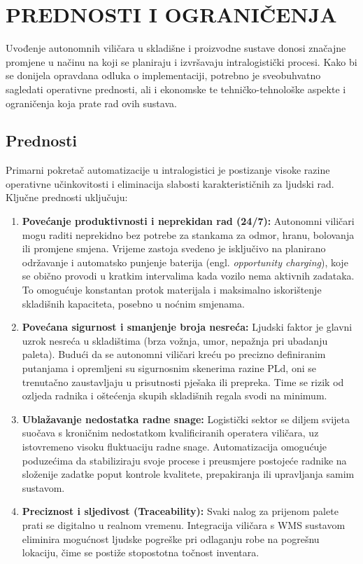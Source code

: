 \documentclass[12pt,a4paper]{article}
\begin{document}
\section{PREDNOSTI I OGRANIČENJA}
Uvođenje autonomnih viličara u skladišne i proizvodne sustave donosi značajne promjene u načinu na koji se planiraju i izvršavaju intralogistički procesi. Kako bi se donijela opravdana odluka o implementaciji, potrebno je sveobuhvatno sagledati operativne prednosti, ali i ekonomske te tehničko-tehnološke aspekte i ograničenja koja prate rad ovih sustava.

\subsection{Prednosti}
Primarni pokretač automatizacije u intralogistici je postizanje visoke razine operativne učinkovitosti i eliminacija slabosti karakterističnih za ljudski rad. Ključne prednosti uključuju:
\begin{enumerate}
    \item \textbf{Povećanje produktivnosti i neprekidan rad (24/7):} Autonomni viličari mogu raditi neprekidno bez potrebe za stankama za odmor, hranu, bolovanja ili promjene smjena. Vrijeme zastoja svedeno je isključivo na planirano održavanje i automatsko punjenje baterija (engl. \textit{opportunity charging}), koje se obično provodi u kratkim intervalima kada vozilo nema aktivnih zadataka. To omogućuje konstantan protok materijala i maksimalno iskorištenje skladišnih kapaciteta, posebno u noćnim smjenama.
    \item \textbf{Povećana sigurnost i smanjenje broja nesreća:} Ljudski faktor je glavni uzrok nesreća u skladištima (brza vožnja, umor, nepažnja pri ubadanju paleta). Budući da se autonomni viličari kreću po precizno definiranim putanjama i opremljeni su sigurnosnim skenerima razine PLd, oni se trenutačno zaustavljaju u prisutnosti pješaka ili prepreka. Time se rizik od ozljeda radnika i oštećenja skupih skladišnih regala svodi na minimum.
    \item \textbf{Ublažavanje nedostatka radne snage:} Logistički sektor se diljem svijeta suočava s kroničnim nedostatkom kvalificiranih operatera viličara, uz istovremeno visoku fluktuaciju radne snage. Automatizacija omogućuje poduzećima da stabiliziraju svoje procese i preusmjere postojeće radnike na složenije zadatke poput kontrole kvalitete, prepakiranja ili upravljanja samim sustavom.
    \item \textbf{Preciznost i sljedivost (Traceability):} Svaki nalog za prijenom palete prati se digitalno u realnom vremenu. Integracija viličara s WMS sustavom eliminira mogućnost ljudske pogreške pri odlaganju robe na pogrešnu lokaciju, čime se postiže stopostotna točnost inventara.
\end{enumerate}
\end{document}

